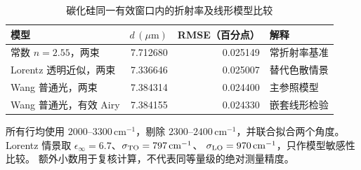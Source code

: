 \begin{table}[htbp]
\centering
\caption{碳化硅同一有效窗口内的折射率及线形模型比较}
\label{tab:sic-models}
\begin{tabular}{lrrl}
\toprule
模型 & $d\,(\mu\mathrm m)$ & RMSE（百分点） & 解释\\
\midrule
常数 $n=2.55$，两束 & 7.712680 & 0.025149 & 常折射率基准\\
Lorentz 透明近似，两束 & 7.336646 & 0.025007 & 替代色散情景\\
Wang 普通光，两束 & 7.384314 & 0.024400 & 主参照模型\\
Wang 普通光，有效 Airy & 7.384155 & 0.024330 & 嵌套线形检验\\
\bottomrule
\end{tabular}
\par\smallskip
\begin{minipage}{0.92\textwidth}\small
所有行均使用 $2000$--$3300\,\mathrm{cm}^{-1}$，剔除
$2300$--$2400\,\mathrm{cm}^{-1}$，并联合拟合两个角度。
Lorentz 情景取 $\epsilon_\infty=6.7$、$\sigma_{\rm TO}=797\,\mathrm{cm}^{-1}$、
$\sigma_{\rm LO}=970\,\mathrm{cm}^{-1}$，只作模型敏感性比较。
额外小数用于复核计算，不代表同等量级的绝对测量精度。
\end{minipage}
\end{table}

